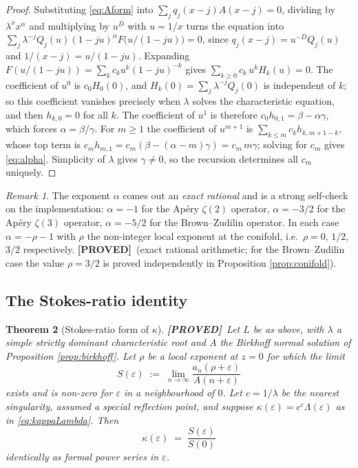 \documentclass[11pt,reqno]{amsart}
\theoremstyle{plain}
\newtheorem{theorem}{Theorem}[section]
\theoremstyle{definition}
\theoremstyle{remark}
\newtheorem{remark}[theorem]{Remark}
\newcommand{\PROVED}{{\normalfont\sffamily\bfseries[PROVED]}}
\newcommand{\eps}{\varepsilon}
\begin{document}
\begin{proof}
Substituting \eqref{eq:Aform} into $\sum_jq_j(x-j)A(x-j)=0$, dividing by $\lambda^{x}x^{\alpha}$
and multiplying by $u^{D}$ with $u=1/x$ turns the equation into
$\sum_{j}\lambda^{-j}Q_j(u)(1-ju)^{\alpha}F\bigl(u/(1-ju)\bigr)=0$, since
$q_j(x-j)=u^{-D}Q_j(u)$ and $1/(x-j)=u/(1-ju)$. Expanding
$F(u/(1-ju))=\sum_k c_ku^{k}(1-ju)^{-k}$ gives
$\sum_{k\ge0}c_k\,u^{k}H_k(u)=0$. The coefficient of $u^{0}$ is $c_0H_0(0)$, and
$H_k(0)=\sum_j\lambda^{-j}Q_j(0)$ is independent of $k$; so this coefficient vanishes precisely
when $\lambda$ solves the characteristic equation, and then $h_{k,0}=0$ for all $k$. The
coefficient of $u^{1}$ is therefore $c_0h_{0,1}=\beta-\alpha\gamma$, which forces
$\alpha=\beta/\gamma$. For $m\ge 1$ the coefficient of $u^{m+1}$ is
$\sum_{k\le m}c_kh_{k,m+1-k}$, whose top term is
$c_mh_{m,1}=c_m(\beta-(\alpha-m)\gamma)=c_m\,m\gamma$; solving for $c_m$ gives \eqref{eq:alpha}.
Simplicity of $\lambda$ gives $\gamma\ne0$, so the recursion determines all $c_m$ uniquely.
\end{proof}

\begin{remark}\label{rem:alphacheck}
The exponent $\alpha$ comes out an \emph{exact rational} and is a strong self-check on the
implementation: $\alpha=-1$ for the Ap\'ery $\zeta(2)$ operator, $\alpha=-3/2$ for the Ap\'ery
$\zeta(3)$ operator, $\alpha=-5/2$ for the Brown--Zudilin operator. In each case
$\alpha=-\rho-1$ with $\rho$ the non-integer local exponent at the conifold, i.e.\ $\rho=0$,
$1/2$, $3/2$ respectively. \PROVED\ (exact rational arithmetic; for the Brown--Zudilin case the
value $\rho=3/2$ is proved independently in Proposition \ref{prop:conifold}).
\end{remark}

\subsection{The Stokes-ratio identity}

\begin{theorem}[Stokes-ratio form of $\kappa$]\label{thm:stokes} \PROVED\
Let $L$ be as above, with $\lambda$ a simple strictly dominant characteristic root and $A$ the
Birkhoff normal solution of Proposition \ref{prop:birkhoff}. Let $\rho$ be a local exponent at
$z=0$ for which the limit
\[
  S(\eps)\;:=\;\lim_{n\to\infty}\frac{a_n(\rho+\eps)}{A(n+\eps)}
\]
exists and is non-zero for $\eps$ in a neighbourhood of $0$. Let $c=1/\lambda$ be the nearest
singularity, assumed a special reflection point, and suppose $\kappa(\eps)=c^{\eps}\Lambda(\eps)$
as in \eqref{eq:kappaLambda}. Then
\begin{equation}\label{eq:stokes}
  \boxed{\;\kappa(\eps)\;=\;\frac{S(\eps)}{S(0)}\;}
\end{equation}
identically as formal power series in $\eps$.
\end{theorem}
\end{document}
